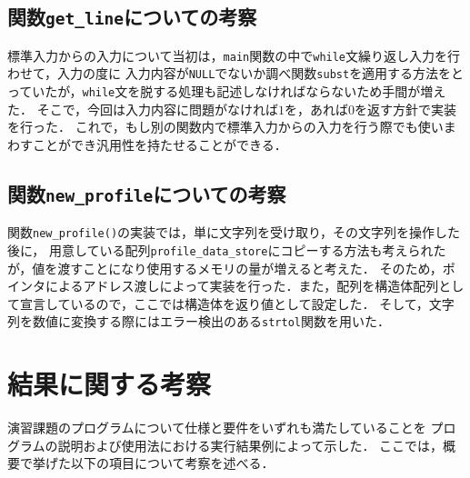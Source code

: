 \documentclass[a4j,11pt]{jarticle}
\begin{document}
\subsection{関数\texttt{get\_line}についての考察}
標準入力からの入力について当初は，\verb|main|関数の中で\verb|while|文繰り返し入力を行わせて，入力の度に
入力内容が\verb|NULL|でないか調べ関数\verb|subst|を適用する方法をとっていたが，\verb|while|文を脱する処理も記述しなければならないため手間が増えた．
そこで，今回は入力内容に問題がなければ$1$を，あれば$0$を返す方針で実装を行った．
これで，もし別の関数内で標準入力からの入力を行う際でも使いまわすことができ汎用性を持たせることができる．

\subsection{関数\texttt{new\_profile}についての考察}
関数\verb|new_profile()|の実装では，単に文字列を受け取り，その文字列を操作した後に，
用意している配列\verb|profile_data_store|にコピーする方法も考えられたが，値を渡すことになり使用するメモリの量が増えると考えた．
そのため，ポインタによるアドレス渡しによって実装を行った．また，配列を構造体配列として宣言しているので，ここでは構造体を返り値として設定した．
そして，文字列を数値に変換する際にはエラー検出のある\verb|strtol|関数を用いた．

\section{結果に関する考察}


演習課題のプログラムについて仕様と要件をいずれも満たしていることを
プログラムの説明および使用法における実行結果例によって示した．
ここでは，概要で挙げた以下の項目について考察を述べる．
\end{document}
